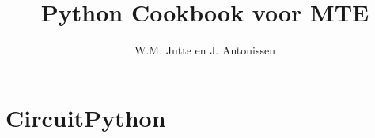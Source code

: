 \documentclass[dutch]{book}
\title{Python Cookbook voor MTE}
\author{W.M. Jutte en J. Antonissen}
\begin{document}
	
	\frontmatter
	\maketitle
	\tableofcontents
	
	\mainmatter
	\part{CircuitPython}
	
	
	
	
	
	
	

	
	
	\appendix
	
	
	
\end{document}
